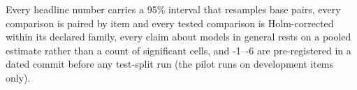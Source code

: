 Every headline number carries a 95\% interval that resamples base pairs, every comparison is paired by item and every tested comparison is Holm-corrected within its declared family, every claim about models in general rests on a pooled estimate rather than a count of significant cells, and \hyp{1}--\hyp{6} are pre-registered in a dated commit before any test-split run (the pilot runs on development items only). 
